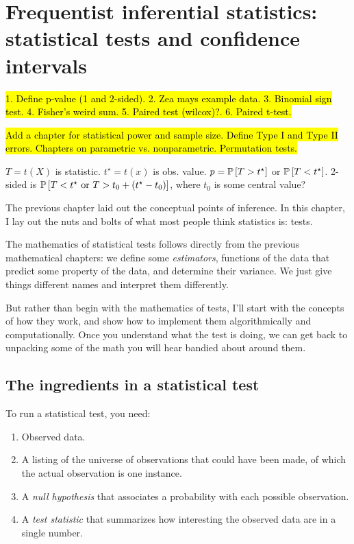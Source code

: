 
\chapter{Frequentist inferential statistics: statistical tests and confidence intervals}

\hl{1. Define p-value (1 and 2-sided). 2. Zea mays example data. 3. Binomial sign test. 4. Fisher's weird sum. 5. Paired test (wilcox)?. 6. Paired t-test.}

\hl{Add a chapter for statistical power and sample size. Define Type I and Type II errors. Chapters on parametric vs. nonparametric. Permutation tests.}

$T=t(X)$ is statistic. $t^\star = t(x)$ is obs. value. $p=\mathbb{P}\left[{T>t^\star}\right]$ or $\mathbb{P}\left[{T<t^\star}\right]$. 2-sided is $\mathbb{P}\left[{T<t^\star \text{ or } T > t_0 + (t^\star-t_0)}\right]$, where $t_0$ is some central value?

The previous chapter laid out the conceptual points of inference. In this chapter, I lay out the nuts and bolts of what most people think statistics is: tests.

The mathematics of statistical tests follows directly from the previous mathematical chapters: we define some \emph{estimators}, functions of the data that predict some property of the data, and determine their variance. We just give things different names and interpret them differently.

But rather than begin with the mathematics of tests, I'll start with the concepts of how they work, and show how to implement them algorithmically and computationally. Once you understand what the test is doing, we can get back to unpacking some of the math you will hear bandied about around them.

\section{The ingredients in a statistical test}

To run a statistical test, you need:

\begin{enumerate}
\item Observed data.
\item A listing of the universe of observations that could have been made, of which the actual observation is one instance.
\item A \emph{null hypothesis} that associates a probability with each possible observation.
\item A \emph{test statistic} that summarizes how interesting the observed data are in a single number.
\end{enumerate}

